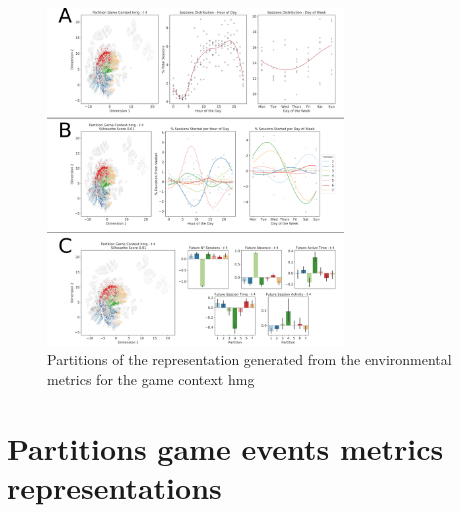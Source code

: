 \begin{figure}[ht]
\includegraphics[width=0.7\textwidth]{images/appendix_D/clust_hmg_env.png}
\centering
\caption[Partitions of the representation generated from the environmental metrics for the game context hmg]{Partitions of the representation generated from the environmental metrics for the game context hmg}
\label{clust_hmg_env} 
\end{figure}
\FloatBarrier

\section{Partitions game events metrics representations}
\label{partitions_game_events}